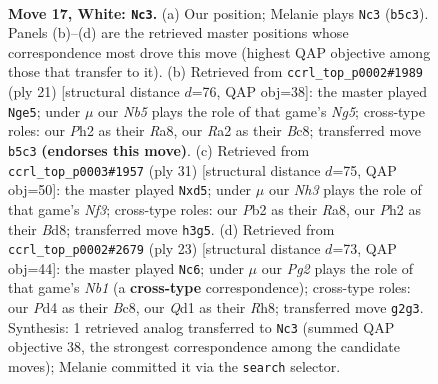 \documentclass[11pt]{article}
\begin{document}
\clearpage

\begin{figure}[p]\centering
\begin{subfigure}{0.46\textwidth}\centering
\resizebox{\linewidth}{!}{%
\newchessgame
\chessboard[
  setfen={r2qk2r/ppp1b3/nn3pp1/1N1p1b1p/P2P4/1B2R2N/RPP2PPP/2BQ2K1 w kq - 10 17},
  showmover=false,
  pgfstyle=straightmove, color=movearrow, markmove={b5-c3}
]}
\caption{}
\end{subfigure}\hfill
\begin{subfigure}{0.46\textwidth}\centering
\resizebox{\linewidth}{!}{%
\newchessgame
\chessboard[
  setfen={r1bqk2r/1p2ppb1/p1np3p/6p1/4P1n1/1NN3B1/PPPQ1PPP/R3KB1R b KQkq - 5 11},
  showmover=false,
  pgfstyle=straightmove, color=movearrow, markmove={g4-e5}
]}
\caption{}
\end{subfigure}
\\[4pt]
\begin{subfigure}{0.46\textwidth}\centering
\resizebox{\linewidth}{!}{%
\newchessgame
\chessboard[
  setfen={r2br1k1/1bpq1ppp/p2p1n2/1p1N4/4P3/PBBP3P/1P3PP1/R2QR1K1 b - - 0 16},
  showmover=false,
  pgfstyle=straightmove, color=movearrow, markmove={f6-d5}
]}
\caption{}
\end{subfigure}\hfill
\begin{subfigure}{0.46\textwidth}\centering
\resizebox{\linewidth}{!}{%
\newchessgame
\chessboard[
  setfen={rnb1k2r/1p2ppb1/pq1p1n1p/6p1/4P3/1NNB2BP/PPP2PP1/R2QK2R b KQkq - 6 12},
  showmover=false,
  pgfstyle=straightmove, color=movearrow, markmove={b8-c6}
]}
\caption{}
\end{subfigure}
\caption{\textbf{Move 17, White: \texttt{Nc3}.} (a) Our position; Melanie plays \texttt{Nc3} (\texttt{b5c3}). Panels (b)--(d) are the retrieved master positions whose correspondence most drove this move (highest QAP objective among those that transfer to it). (b) Retrieved from \texttt{ccrl\_top\_p0002\#1989} (ply 21) [structural distance $d$=76, QAP obj=38]: the master played \texttt{Nge5}; under $\mu$ our \emph{Nb5} plays the role of that game's \emph{Ng5}; cross-type roles: our \emph{P}h2 as their \emph{R}a8, our \emph{R}a2 as their \emph{B}c8; transferred move \texttt{b5c3} \textbf{(endorses this move)}. (c) Retrieved from \texttt{ccrl\_top\_p0003\#1957} (ply 31) [structural distance $d$=75, QAP obj=50]: the master played \texttt{Nxd5}; under $\mu$ our \emph{Nh3} plays the role of that game's \emph{Nf3}; cross-type roles: our \emph{P}b2 as their \emph{R}a8, our \emph{P}h2 as their \emph{B}d8; transferred move \texttt{h3g5}. (d) Retrieved from \texttt{ccrl\_top\_p0002\#2679} (ply 23) [structural distance $d$=73, QAP obj=44]: the master played \texttt{Nc6}; under $\mu$ our \emph{Pg2} plays the role of that game's \emph{Nb1} (a \textbf{cross-type} correspondence); cross-type roles: our \emph{P}d4 as their \emph{B}c8, our \emph{Q}d1 as their \emph{R}h8; transferred move \texttt{g2g3}. Synthesis: 1 retrieved analog transferred to \texttt{Nc3} (summed QAP objective 38, the strongest correspondence among the candidate moves); Melanie committed it via the \texttt{search} selector.}
\label{fig:thought-m32}
\end{figure}
\end{document}
